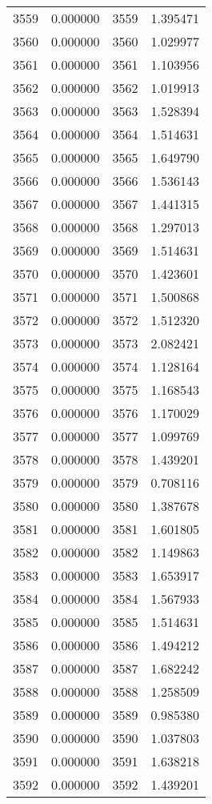 \documentclass[12pt]{article}
\begin{document}
\begin{longtable}{@{}cccc@{}}
3559 & 0.000000 & 3559 & 1.395471 \\
3560 & 0.000000 & 3560 & 1.029977 \\
3561 & 0.000000 & 3561 & 1.103956 \\
3562 & 0.000000 & 3562 & 1.019913 \\
3563 & 0.000000 & 3563 & 1.528394 \\
3564 & 0.000000 & 3564 & 1.514631 \\
3565 & 0.000000 & 3565 & 1.649790 \\
3566 & 0.000000 & 3566 & 1.536143 \\
3567 & 0.000000 & 3567 & 1.441315 \\
3568 & 0.000000 & 3568 & 1.297013 \\
3569 & 0.000000 & 3569 & 1.514631 \\
3570 & 0.000000 & 3570 & 1.423601 \\
3571 & 0.000000 & 3571 & 1.500868 \\
3572 & 0.000000 & 3572 & 1.512320 \\
3573 & 0.000000 & 3573 & 2.082421 \\
3574 & 0.000000 & 3574 & 1.128164 \\
3575 & 0.000000 & 3575 & 1.168543 \\
3576 & 0.000000 & 3576 & 1.170029 \\
3577 & 0.000000 & 3577 & 1.099769 \\
3578 & 0.000000 & 3578 & 1.439201 \\
3579 & 0.000000 & 3579 & 0.708116 \\
3580 & 0.000000 & 3580 & 1.387678 \\
3581 & 0.000000 & 3581 & 1.601805 \\
3582 & 0.000000 & 3582 & 1.149863 \\
3583 & 0.000000 & 3583 & 1.653917 \\
3584 & 0.000000 & 3584 & 1.567933 \\
3585 & 0.000000 & 3585 & 1.514631 \\
3586 & 0.000000 & 3586 & 1.494212 \\
3587 & 0.000000 & 3587 & 1.682242 \\
3588 & 0.000000 & 3588 & 1.258509 \\
3589 & 0.000000 & 3589 & 0.985380 \\
3590 & 0.000000 & 3590 & 1.037803 \\
3591 & 0.000000 & 3591 & 1.638218 \\
3592 & 0.000000 & 3592 & 1.439201 \\

\end{longtable}
\end{document}
